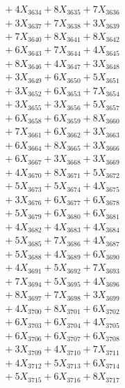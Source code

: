 \documentclass[a4paper,10pt]{article}
\begin{document}
{\begin{align}
&\;  + 4 X_{3634} + 8 X_{3635} + 7 X_{3636} \\[0.3ex]
&\;  + 3 X_{3637} + 7 X_{3638} + 3 X_{3639} \\[0.5ex]\allowbreak
&\;  + 7 X_{3640} + 8 X_{3641} + 8 X_{3642} \\[0.3ex]
&\;  + 6 X_{3643} + 7 X_{3644} + 4 X_{3645} \\[0.3ex]
&\;  + 8 X_{3646} + 4 X_{3647} + 3 X_{3648} \\[0.3ex]
&\;  + 3 X_{3649} + 6 X_{3650} + 5 X_{3651} \\[0.3ex]
&\;  + 3 X_{3652} + 6 X_{3653} + 7 X_{3654} \\[0.3ex]
&\;  + 3 X_{3655} + 3 X_{3656} + 5 X_{3657} \\[0.3ex]
&\;  + 6 X_{3658} + 6 X_{3659} + 8 X_{3660} \\[0.3ex]
&\;  + 7 X_{3661} + 6 X_{3662} + 3 X_{3663} \\[0.3ex]
&\;  + 6 X_{3664} + 8 X_{3665} + 3 X_{3666} \\[0.3ex]
&\;  + 6 X_{3667} + 3 X_{3668} + 3 X_{3669} \\[0.5ex]\allowbreak
&\;  + 4 X_{3670} + 8 X_{3671} + 5 X_{3672} \\[0.3ex]
&\;  + 5 X_{3673} + 5 X_{3674} + 4 X_{3675} \\[0.3ex]
&\;  + 3 X_{3676} + 6 X_{3677} + 6 X_{3678} \\[0.3ex]
&\;  + 5 X_{3679} + 6 X_{3680} + 6 X_{3681} \\[0.3ex]
&\;  + 4 X_{3682} + 4 X_{3683} + 4 X_{3684} \\[0.3ex]
&\;  + 5 X_{3685} + 7 X_{3686} + 4 X_{3687} \\[0.3ex]
&\;  + 5 X_{3688} + 4 X_{3689} + 6 X_{3690} \\[0.3ex]
&\;  + 4 X_{3691} + 5 X_{3692} + 7 X_{3693} \\[0.3ex]
&\;  + 7 X_{3694} + 5 X_{3695} + 4 X_{3696} \\[0.3ex]
&\;  + 8 X_{3697} + 7 X_{3698} + 3 X_{3699} \\[0.5ex]\allowbreak
&\;  + 4 X_{3700} + 8 X_{3701} + 6 X_{3702} \\[0.3ex]
&\;  + 6 X_{3703} + 6 X_{3704} + 4 X_{3705} \\[0.3ex]
&\;  + 6 X_{3706} + 6 X_{3707} + 6 X_{3708} \\[0.3ex]
&\;  + 3 X_{3709} + 4 X_{3710} + 7 X_{3711} \\[0.3ex]
&\;  + 4 X_{3712} + 5 X_{3713} + 6 X_{3714} \\[0.3ex]
&\;  + 5 X_{3715} + 6 X_{3716} + 8 X_{3717} \\[0.3ex]

\end{align}}
\end{document}
